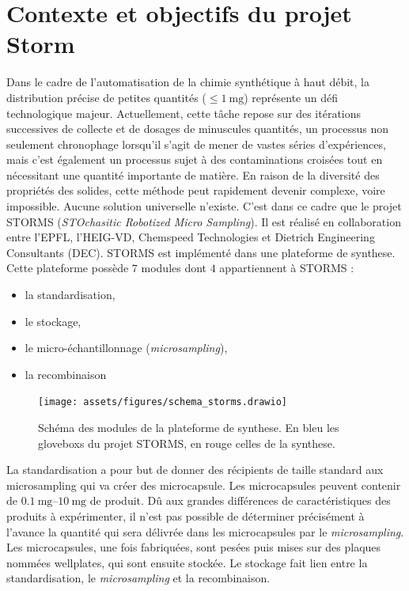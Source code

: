 \section{Contexte et objectifs du projet Storm}
Dans le cadre de l'automatisation de la chimie synthétique à haut débit, la distribution précise de petites quantités ($\leq \qty{1}{\mg}$) représente un défi technologique majeur. Actuellement, cette tâche repose sur des itérations successives de collecte et de dosages de minuscules quantités, un processus non seulement chronophage lorsqu'il s'agit de mener de vastes séries d'expériences, mais c'est également un processus sujet à des contaminations croisées tout en nécessitant une quantité importante de matière. En raison de la diversité des propriétés des solides, cette méthode peut rapidement devenir complexe, voire impossible. Aucune solution universelle n'existe.
C'est dans ce cadre que le projet STORMS (\textit{STOchasitic Robotized Micro Sampling}). Il est réalisé en collaboration entre l'EPFL, l'HEIG-VD, Chemspeed Technologies et Dietrich Engineering Consultants (DEC).
STORMS est implémenté dans une plateforme de \gls{synthese}. Cette plateforme possède $7$ modules dont $4$ appartiennent à STORMS : 
\begin{itemize}
    \item la standardisation,
    \item le stockage,
    \item le micro-échantillonnage (\textit{microsampling}),
    \item la recombinaison
\end{itemize}
\begin{figure}[h]
    \centering
    \texttt{[image: assets/figures/schema\_storms.drawio]}
    \caption[Schema des modules de la platforme de \gls{synthese}]{Schéma des modules de la plateforme de \gls{synthese}. En bleu les \glspl{glovebox} du projet STORMS, en rouge celles de la \gls{synthese}.}
    \label{fig:schema_module_storms}
\end{figure}
La standardisation a pour but de donner des récipients de taille standard aux microsampling qui va créer des \gls{microcapsule}.
Les \glspl{microcapsule} peuvent contenir de $\qtyrange[range-units=single]{0.1}{10}{\mg}$ de produit. Dû aux grandes différences de caractéristiques des produits à expérimenter, il n'est pas possible de déterminer précisément à l'avance la quantité qui sera délivrée dans les \glspl{microcapsule} par le \textit{microsampling}.
Les \glspl{microcapsule}, une fois fabriquées, sont pesées puis mises sur des plaques nommées \glspl{wellplate}, qui sont ensuite stockée. Le stockage fait lien entre la standardisation, le \textit{microsampling} et la recombinaison.
